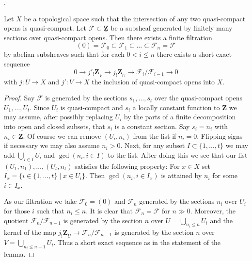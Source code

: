 \begin{lemma}
\label{lemma-subsheaf-of-constant-sheaf}
\begin{reference}
\cite[Page 168]{Tohoku}.
\end{reference}
Let $X$ be a topological space such that the intersection of any
two quasi-compact opens is quasi-compact. Let
$\mathcal{F} \subset \underline{\mathbf{Z}}$
be a subsheaf generated by finitely many sections over quasi-compact opens.
Then there exists a finite filtration
$$
(0) = \mathcal{F}_0 \subset \mathcal{F}_1 \subset \ldots \subset
\mathcal{F}_n = \mathcal{F}
$$
by abelian subsheaves such that for each $0 < i \leq n$
there exists a short exact sequence
$$
0 \to j'_!\underline{\mathbf{Z}}_V \to j_!\underline{\mathbf{Z}}_U \to
\mathcal{F}_i/\mathcal{F}_{i - 1} \to 0
$$
with $j : U \to X$ and $j' : V \to X$ the inclusion of quasi-compact opens
into $X$.
\end{lemma}

\begin{proof}
Say $\mathcal{F}$ is generated by the sections $s_1, \ldots, s_t$ over the
quasi-compact opens $U_1, \ldots, U_t$. Since $U_i$ is quasi-compact and
$s_i$ a locally constant function to $\mathbf{Z}$ we may assume, after
possibly replacing $U_i$ by the parts of a finite decomposition into open
and closed subsets, that $s_i$ is a constant section.
Say $s_i = n_i$ with $n_i \in \mathbf{Z}$. Of course we can remove
$(U_i, n_i)$ from the list if $n_i = 0$. Flipping signs if necessary
we may also assume $n_i > 0$. Next, for any subset $I \subset \{1, \ldots, t\}$
we may add $\bigcup_{i \in I} U_i$ and $\gcd(n_i, i \in I)$ to the list.
After doing this we see that our list $(U_1, n_1), \ldots, (U_t, n_t)$
satisfies the following property:
For $x \in X$ set $I_x = \{i \in \{1, \ldots, t\} \mid x \in U_i\}$.
Then $\gcd(n_i, i \in I_x)$ is attained by $n_i$ for some $i \in I_x$.

\medskip\noindent
As our filtration we take $\mathcal{F}_0 = (0)$ and
$\mathcal{F}_n$ generated by the sections $n_i$ over $U_i$ for those
$i$ such that $n_i \leq n$. It is clear that
$\mathcal{F}_n = \mathcal{F}$ for $n \gg 0$. Moreover, the quotient
$\mathcal{F}_n/\mathcal{F}_{n - 1}$ is generated by the section
$n$ over $U = \bigcup_{n_i \leq n} U_i$ and the kernel of the map
$j_!\underline{\mathbf{Z}}_U \to \mathcal{F}_n/\mathcal{F}_{n - 1}$
is generated by the section $n$ over $V = \bigcup_{n_i \leq n - 1} U_i$.
Thus a short exact sequence as in the statement of the lemma.
\end{proof}


